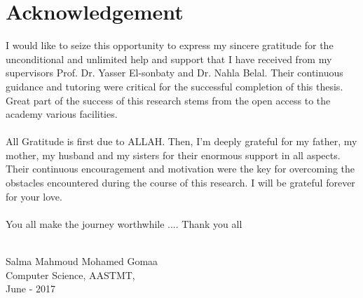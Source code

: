 \documentclass[12pt]{llncs}
\begin{document}

\newpage
\section*{Acknowledgement}

I would like to seize this opportunity to express my sincere gratitude for the
unconditional and unlimited help and support that I have received from my supervisors Prof.
Dr. Yasser El-sonbaty and Dr. Nahla Belal. Their continuous guidance and tutoring were
critical for the successful completion of this thesis. Great part of the success of this research stems from the open access to the academy various facilities. 
\\
\\
All Gratitude is first due to ALLAH. Then, I'm deeply grateful for my father, my mother, my husband and my sisters for their enormous support in all aspects. Their continuous encouragement and motivation were the key for overcoming the obstacles encountered during the course of this research. I will be grateful forever for your love.
\\
\\
You all make the journey worthwhile .... Thank you all
\\
\\
\begin{flushright}
Salma Mahmoud Mohamed Gomaa\\
Computer Science, AASTMT,\\
June - 2017
\end{flushright}

\newpage
{}
\tableofcontents
\newpage
\listoffigures
\newpage
\listoftables

\newpage
\end{document}
